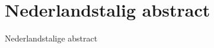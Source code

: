 \newpage

\chapter*{Nederlandstalig abstract}


\begin{slshape}

Nederlandstalige abstract 


\end{slshape}
